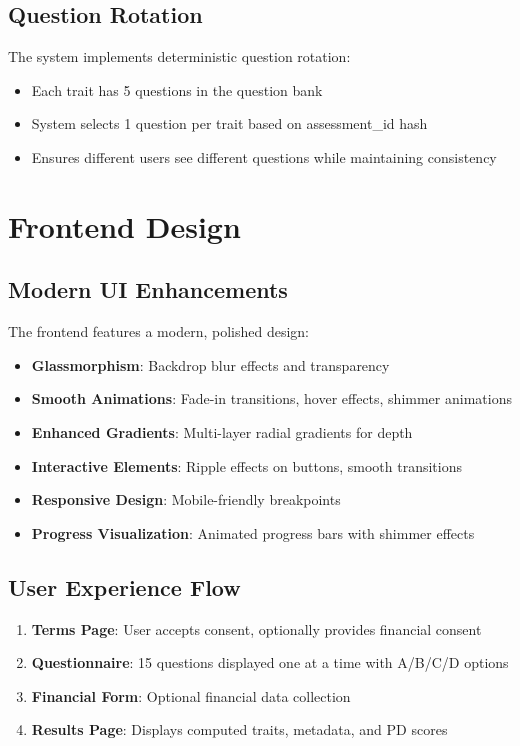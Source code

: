 \documentclass[11pt,a4paper]{article}
\begin{document}
\subsection{Question Rotation}
The system implements deterministic question rotation:
\begin{itemize}
    \item Each trait has 5 questions in the question bank
    \item System selects 1 question per trait based on assessment\_id hash
    \item Ensures different users see different questions while maintaining consistency
\end{itemize}

\section{Frontend Design}

\subsection{Modern UI Enhancements}
The frontend features a modern, polished design:

\begin{itemize}
    \item \textbf{Glassmorphism}: Backdrop blur effects and transparency
    \item \textbf{Smooth Animations}: Fade-in transitions, hover effects, shimmer animations
    \item \textbf{Enhanced Gradients}: Multi-layer radial gradients for depth
    \item \textbf{Interactive Elements}: Ripple effects on buttons, smooth transitions
    \item \textbf{Responsive Design}: Mobile-friendly breakpoints
    \item \textbf{Progress Visualization}: Animated progress bars with shimmer effects
\end{itemize}

\subsection{User Experience Flow}
\begin{enumerate}
    \item \textbf{Terms Page}: User accepts consent, optionally provides financial consent
    \item \textbf{Questionnaire}: 15 questions displayed one at a time with A/B/C/D options
    \item \textbf{Financial Form}: Optional financial data collection
    \item \textbf{Results Page}: Displays computed traits, metadata, and PD scores
\end{enumerate}
\end{document}
